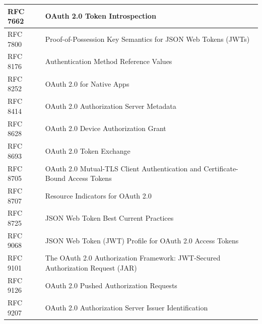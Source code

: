 \begin{table}[H]
{\begin{tabular}{@{}ll@{}}
	\multicolumn{1}{|l|}{RFC 7662} & \multicolumn{1}{l|}{OAuth 2.0 Token Introspection}                                                  \\ \midrule
	\multicolumn{1}{|l|}{RFC 7800} & \multicolumn{1}{l|}{Proof-of-Possession Key Semantics for JSON Web Tokens (JWTs)}                   \\ \midrule
	\multicolumn{1}{|l|}{RFC 8176} & \multicolumn{1}{l|}{Authentication Method Reference Values}                                         \\ \midrule
	\multicolumn{1}{|l|}{RFC 8252} & \multicolumn{1}{l|}{OAuth 2.0 for Native Apps}                                                      \\ \midrule
	\multicolumn{1}{|l|}{RFC 8414} & \multicolumn{1}{l|}{OAuth 2.0 Authorization Server Metadata}                                        \\ \midrule
	\multicolumn{1}{|l|}{RFC 8628} & \multicolumn{1}{l|}{OAuth 2.0 Device Authorization Grant}                                           \\ \midrule
	\multicolumn{1}{|l|}{RFC 8693} & \multicolumn{1}{l|}{OAuth 2.0 Token Exchange}                                                       \\ \midrule
	\multicolumn{1}{|l|}{RFC 8705} & \multicolumn{1}{l|}{OAuth 2.0 Mutual-TLS Client Authentication and Certificate-Bound Access Tokens} \\ \midrule
	\multicolumn{1}{|l|}{RFC 8707} & \multicolumn{1}{l|}{Resource Indicators for OAuth 2.0}                                              \\ \midrule
	\multicolumn{1}{|l|}{RFC 8725} & \multicolumn{1}{l|}{JSON Web Token Best Current Practices}                                          \\ \midrule
	\multicolumn{1}{|l|}{RFC 9068} & \multicolumn{1}{l|}{JSON Web Token (JWT) Profile for OAuth 2.0 Access Tokens}                       \\ \midrule
	\multicolumn{1}{|l|}{RFC 9101} & \multicolumn{1}{l|}{The OAuth 2.0 Authorization Framework: JWT-Secured Authorization Request (JAR)} \\ \midrule
	\multicolumn{1}{|l|}{RFC 9126} & \multicolumn{1}{l|}{OAuth 2.0 Pushed Authorization Requests}                                        \\ \midrule
	\multicolumn{1}{|l|}{RFC 9207} & \multicolumn{1}{l|}{OAuth 2.0 Authorization Server Issuer Identification}                           \\ \midrule

\end{tabular}}
\end{table}
